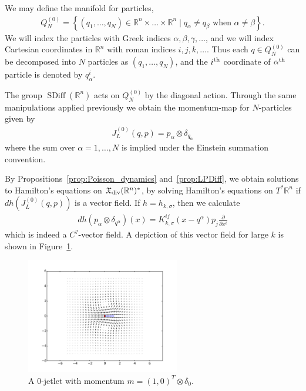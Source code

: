 \documentclass[12pt]{amsart}
\newcommand{\pder}[2]{\ensuremath{\frac{\partial #1}{\partial #2}}}
\newcommand{\R}{\ensuremath{\mathbb{R}}}
\DeclareMathOperator{\SDiff}{SDiff}
\begin{document}
We may define the manifold for particles,
\begin{align*}
  Q_N^{(0)} = \left\{ (q_1,\dots,q_N) \in \R^n \times \dots\times \R^n
                 \mid q_\alpha \neq q_\beta \text{ when } \alpha \neq \beta \right\}.
\end{align*}
We will index the particles with Greek indices $\alpha,\beta,\gamma,\dots$, and we will index Cartesian coordinates in $\R^n$ with roman indices $i,j,k,\dots$.
Thus each $q \in Q_N^{(0)}$ can be decomposed into $N$ particles as $(q_1,\dots,q_N)$, and the $i^{\rm th}$ coordinate of $\alpha^{\rm th}$ particle is denoted by $q_\alpha^i$.

The group $\SDiff(\R^n)$ acts on $Q_N^{(0)}$ by the diagonal action.
Through the same manipulations applied previously we obtain the
momentum-map for $N$-particles given by
\begin{align*}
  J_L^{(0)}(q,p) = p_{\alpha} \otimes \delta_{q_\alpha}
\end{align*}
where the sum over $\alpha = 1,\dots,N$ is implied under
the Einstein summation convention.

By Propositions~\ref{prop:Poisson_dynamics} and~\ref{prop:LPDiff},
we obtain solutions to Hamilton's equations
on $\mathfrak{X}_{\rm div}(\R^n)^*$, by solving
Hamilton's equations on $T^*\R^n$ if $dh( J_L^{(0)}(q,p) )$ is
a vector field.  If $h = h_{k,\sigma}$, then we calculate
\begin{align*}
	dh( p_\alpha \otimes \delta_{q^\alpha} )  (x) = K_{k,\sigma}^{ij}(x - q^\alpha) p_j \pder{}{x^i}
\end{align*}
which is indeed a $C^?$-vector field.
A depiction of this vector field for large $k$ is shown in Figure~\ref{fig:zero_jetlet}.

\begin{figure}
	\centering
	\includegraphics[width = 0.6\textwidth]{./images/zero_jet}
	\caption{A $0$-jetlet with momentum $m = (1,0)^T \otimes \delta_0$.}
	\label{fig:zero_jetlet}
\end{figure}
\end{document}
